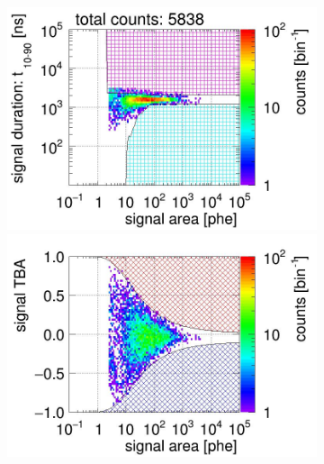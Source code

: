 \begin{landscape}
\begin{figure}[!p]
\begin{subfigure}[t]{0.33\textwidth}
			\caption{}
			\label{fig:signal selection dv 14 01}
		\end{subfigure}
		\begin{subfigure}[t]{0.33\textwidth}
			\centering
			\includegraphics[width=\figurewidth,clip,trim={0 98 0 0}]{Figures/GasTest/CutsValid/res64769/pdpa23Vecfig64769.jpg}
			\includegraphics[width=\figurewidth,clip,trim={0 98 0 40}]{Figures/GasTest/CutsValid/res64769/tbapa23Vecfig64769.jpg}

\end{subfigure}
\end{figure}
\end{landscape}
